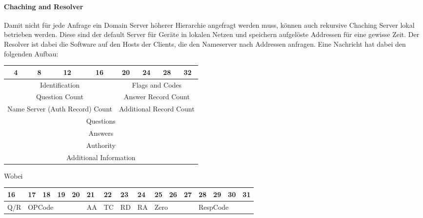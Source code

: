 		\paragraph{Chaching and Resolver}
			Damit nicht für jede Anfrage ein Domain Server höherer Hierarchie angefragt werden muss, können auch rekursive Chaching Server lokal betrieben werden. Diese sind der default Server für Geräte in lokalen Netzen und speichern aufgelöste Addressen für eine gewisse Zeit. Der Resolver ist dabei die Software auf den Hosts der Clients, die den Nameserver nach Addressen anfragen. Eine Nachricht hat dabei den folgenden Aufbau: 
			\begin{table}[ht]
				\centering
				\begin{tabular}{|c|c|c|c|c|c|c|c|}
				\hline
				4            & 8          & 12          & 16          & 20        & 24        & 28        & 32       \\ \hline \hline
				\multicolumn{4}{|c|}{Identification}                  & \multicolumn{4}{c|}{Flags and Codes}         \\ \hline
				\multicolumn{4}{|c|}{Question Count}                  & \multicolumn{4}{c|}{Answer Record Count}     \\ \hline
				\multicolumn{4}{|c|}{Name Server (Auth Record) Count} & \multicolumn{4}{c|}{Additional Record Count} \\ \hline
				\multicolumn{8}{|c|}{Questions}                                                                      \\ \hline
				\multicolumn{8}{|c|}{Answers}                                                                        \\ \hline
				\multicolumn{8}{|c|}{Authority}                                                                      \\ \hline
				\multicolumn{8}{|c|}{Additional Information}                                                         \\ \hline
				\end{tabular}
			\end{table}

			Wobei 
			\begin{table}[ht]
				\centering
				\begin{tabular}{llllllllllllllll}
				16 &
				17 &
				18 &
				19 &
				20 &
				21 &
				22 &
				23 &
				24 &
				25 &
				26 &
				27 &
				28 &
				29 &
				30 &
				31 \\ \hline 
				\multicolumn{1}{|l|}{Q/R} &
				\multicolumn{4}{l|}{OPCode} &
				\multicolumn{1}{l|}{AA} &
				\multicolumn{1}{l|}{TC} &
				\multicolumn{1}{l|}{RD} &
				\multicolumn{1}{l|}{RA} &
				\multicolumn{3}{l|}{Zero} &
				\multicolumn{4}{l|}{RespCode} \\ \hline
				\end{tabular}
			\end{table}
			

